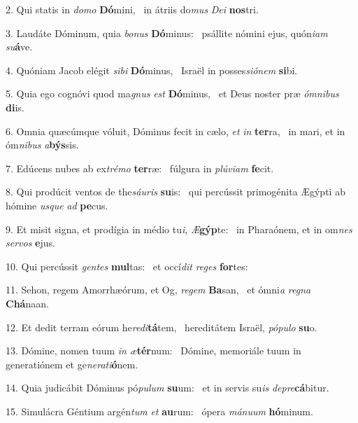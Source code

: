 2. Qui statis in \textit{do}\textit{mo} \textbf{Dó}mini, \ast\  in átriis do\textit{mus} \textit{De}\textit{i} \textbf{nos}tri.\

3. Laudáte Dóminum, quia \textit{bo}\textit{nus} \textbf{Dó}minus: \ast\  psállite nómini ejus, quón\textit{i}\textit{am} \textit{su}\textbf{á}ve.\

4. Quóniam Jacob elégit \textit{si}\textit{bi} \textbf{Dó}minus, \ast\  Israël in posses\textit{si}\textit{ó}\textit{nem} \textbf{si}bi.\

5. Quia ego cognóvi quod ma\textit{gnus} \textit{est} \textbf{Dó}minus, \ast\  et Deus noster præ \textit{óm}\textit{ni}\textit{bus} \textbf{di}is.\

6. Omnia quæcúmque vóluit, Dóminus fecit in cælo, \textit{et} \textit{in} \textbf{ter}ra, \ast\  in mari, et in óm\textit{ni}\textit{bus} \textit{a}\textbf{býs}sis.\

7. Edúcens nubes ab ex\textit{tré}\textit{mo} \textbf{ter}ræ: \ast\  fúlgura in \textit{plú}\textit{vi}\textit{am} \textbf{fe}cit.\

8. Qui prodúcit ventos de the\textit{sáu}\textit{ris} \textbf{su}is: \ast\  qui percússit primogénita Ægýpti ab hómine \textit{us}\textit{que} \textit{ad} \textbf{pe}cus.\

9. Et misit signa, et prodígia in médio tu\textit{i}, \textit{Æ}\textbf{gýp}te: \ast\  in Pharaónem, et in om\textit{nes} \textit{ser}\textit{vos} \textbf{e}jus.\

10. Qui percússit \textit{gen}\textit{tes} \textbf{mul}tas: \ast\  et occí\textit{dit} \textit{re}\textit{ges} \textbf{for}tes:\

11. Sehon, regem Amorrhæórum, et Og, \textit{re}\textit{gem} \textbf{Ba}san, \ast\  et ómni\textit{a} \textit{re}\textit{gna} \textbf{Chá}naan.\

12. Et dedit terram eórum he\textit{re}\textit{di}\textbf{tá}tem, \ast\  hereditátem Israël, \textit{pó}\textit{pu}\textit{lo} \textbf{su}o.\

13. Dómine, nomen tuum \textit{in} \textit{æ}\textbf{tér}num: \ast\  Dómine, memoriále tuum in generatiónem et ge\textit{ne}\textit{ra}\textit{ti}\textbf{ó}nem.\

14. Quia judicábit Dóminus pó\textit{pu}\textit{lum} \textbf{su}um: \ast\  et in servis su\textit{is} \textit{de}\textit{pre}\textbf{cá}bitur.\

15. Simulácra Géntium argén\textit{tum} \textit{et} \textbf{au}rum: \ast\  ópera \textit{má}\textit{nu}\textit{um} \textbf{hó}minum.\

